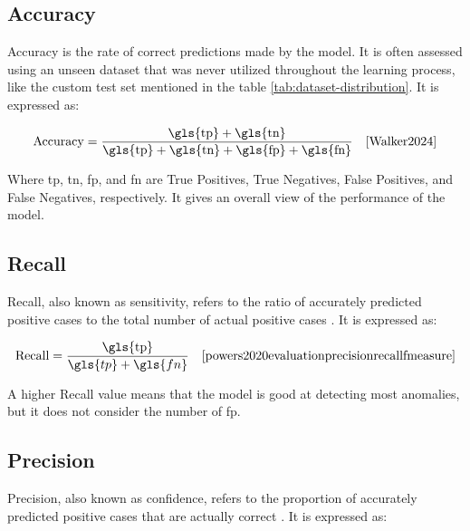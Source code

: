 \subsection*{Accuracy}
\label{subsec:Accuracy}

Accuracy is the rate of correct predictions made by the model. It is often assessed using an unseen dataset that was never utilized throughout the learning process\cite{Kohavi1998}, like the custom test set mentioned in the table \ref{tab:dataset-distribution}. It is expressed as: 

\begin{equation}
    \text{Accuracy} = \frac{\text{\gls{tp}} + \text{\gls{tn}}}{\text{\gls{tp}} + \text{\gls{tn}} + \text{\gls{fp}} + \text{\gls{fn}}} \quad \text{\cite{Walker2024}}
    \label{eq:accuracy}
\end{equation}

Where \gls{tp}, \gls{tn}, \gls{fp}, and \gls{fn} are True Positives, True Negatives, False Positives, and False Negatives, respectively. It gives an overall view of the performance of the model.

\subsection*{Recall}
\label{subsec:Recall}

Recall, also known as sensitivity, refers to the ratio of accurately predicted positive cases to the total number of actual positive cases \cite{powers2020evaluationprecisionrecallfmeasure}. It is expressed as:

\begin{equation}
    \text{Recall} = \frac{\text{\gls{tp}}}{\gls{tp} + \gls{fn}} \quad \text{\cite{powers2020evaluationprecisionrecallfmeasure}}
    \label{eq:recall}
\end{equation}

A higher Recall value means that the model is good at detecting most anomalies, but it does not consider the number of \gls{fp}.

\subsection*{Precision}
\label{subsec:Precision}

Precision, also known as confidence, refers to the proportion of accurately predicted positive cases that are actually correct \cite{powers2020evaluationprecisionrecallfmeasure}. It is expressed as:

